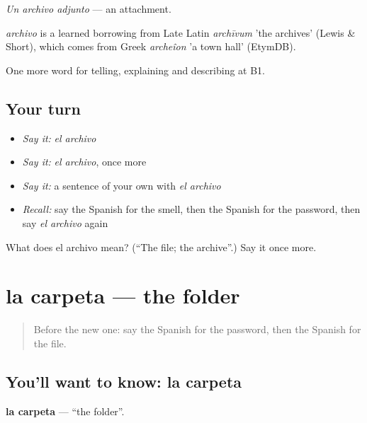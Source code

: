 \emph{Un archivo adjunto} — an attachment.

\begin{cousinweb}
\emph{archivo} is a learned borrowing from Late Latin \emph{archīvum} 'the archives' (Lewis \& Short), which comes from Greek \emph{archeîon} 'a town hall' (EtymDB).
\end{cousinweb}

\begin{grammarlens}[title={What you've built}]
One more word for telling, explaining and describing at B1.
\end{grammarlens}

\subsection*{Your turn}
\begin{itemize}
\raggedright
  \item \emph{Say it:} \emph{el archivo}
  \item \emph{Say it:} \emph{el archivo}, once more
  \item \emph{Say it:} a sentence of your own with \emph{el archivo}
  \item \emph{Recall:} say the Spanish for the smell, then the Spanish for the password, then say \emph{el archivo} again
\end{itemize}

\begin{tcolorbox}[breakable,colback=teal!4,colframe=teal!35!black,title={Before you move on}]
What does el archivo mean? (\textquotedblleft{}The file; the archive\textquotedblright{}.) Say it once more.
\end{tcolorbox}
\section[la carpeta]{la carpeta — the folder}

\label{lesson:ES-C776-carpeta}



\begin{quote}
Before the new one: say the Spanish for the password, then the Spanish for the file.
\end{quote}

\subsection*{You'll want to know: la carpeta}
\textbf{la carpeta} — \textquotedblleft{}the folder\textquotedblright{}.

